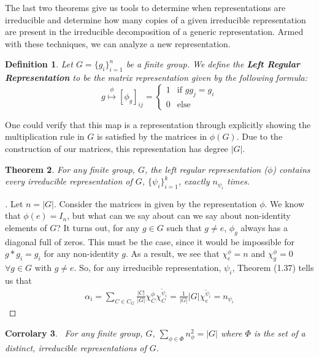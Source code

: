 \documentclass[10pt]{ucthesis}
\newtheorem{definition}{Definition}[chapter]
\newtheorem{theorem}[definition]{Theorem}
\newtheorem{corrolary}[definition]{Corrolary}
\begin{document}
The last two theorems give us tools to determine when representations are irreducible and determine how many copies of a given irreducible representation are present in the irreducible decomposition of a generic representation. Armed with these techniques, we can analyze a new representation.

\begin{definition}
	Let $G=\{g_i\}^n_{i=1}$ be a finite group. We define the \textbf{Left Regular Representation} to be the matrix representation given by the following formula:
$$g\stackrel{\phi}{\mapsto} [\phi_g]_{ij} = \begin{cases}
								1 & \text{if } gg_j = g_i \\
								0 & \text{else}
							\end{cases}$$
\end{definition}

One could verify that this map is a representation through explicitly showing the multiplication rule in $G$ is satisfied by the matrices in $\phi(G)$. Due to the construction of our matrices, this representation has degree $|G|$. 

\begin{theorem}
	For any finite group, $G$, the left regular representation ($\phi$) contains every irreducible representation of $G$, $\{\psi_i\}_{i=1}^k$, exactly $n_{\psi_i}$ times.
\end{theorem}

\noindent\begin{proof}[\cite{Tung}] Let $n=|G|$. Consider the matrices in given by the representation $\phi$. We know that $\phi(e) = I_n$, but what can we say about can we say about non-identity elements of $G$? It turns out, for any $g\in G$ such that $g\neq e$, $\phi_g$ always has a diagonal full of zeros. This must be the case, since it would be impossible for $g *g_i = g_i$  for any non-identity $g$. As a result, we see that $\chi^\phi_e = n$ and $\chi^\phi_g = 0$ $\forall g \in G$ with $g \neq e$. So, for any irreducible representation, $\psi_i$, Theorem (1.37) tells us that 
\begin{equation}
	\begin{aligned}
		\alpha_i = \sum_{C\in C_G} \frac{|C|}{|G|} \chi^\phi_C \overline{\chi_C^{\psi_i}} = \frac{1}{|G|}|G| \overline{\chi_e^{\psi_i}} = n_{\psi_i}
	\end{aligned}
\end{equation}
\end{proof}

\begin{corrolary}
\	For any finite group, $G$, $\sum_{\phi \in \Phi} n_\phi^2 = |G|$ where $\Phi$ is the set of a distinct, irreducible representations of $G$.
\end{corrolary}
\end{document}

